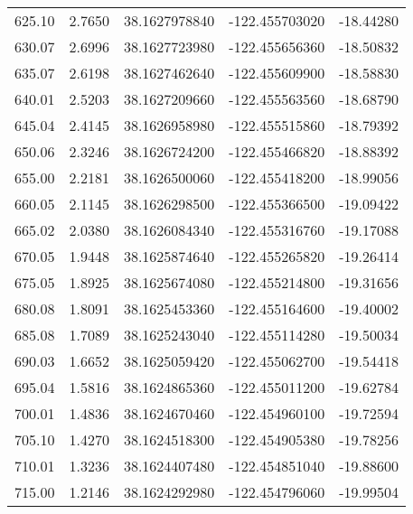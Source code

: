 \begin{scriptsize}
\begin{longtable}{p{2.5cm}p{2.5cm}p{3cm}p{3cm}p{2.5cm}}
           625.10  & 	 2.7650 &               38.1627978840  &   -122.455703020   &	-18.44280 \\
           630.07  & 	 2.6996 &               38.1627723980  &   -122.455656360   &	-18.50832 \\
           635.07  & 	 2.6198 &               38.1627462640  &   -122.455609900   &	-18.58830 \\
           640.01  & 	 2.5203 &               38.1627209660  &   -122.455563560   &	-18.68790 \\
           645.04  & 	 2.4145 &               38.1626958980  &   -122.455515860   &	-18.79392 \\
           650.06  & 	 2.3246 &               38.1626724200  &   -122.455466820   &	-18.88392 \\
           655.00  & 	 2.2181 &               38.1626500060  &   -122.455418200   &	-18.99056 \\
           660.05  & 	 2.1145 &               38.1626298500  &   -122.455366500   &	-19.09422 \\
           665.02  & 	 2.0380 &               38.1626084340  &   -122.455316760   &	-19.17088 \\
           670.05  & 	 1.9448 &               38.1625874640  &   -122.455265820   &	-19.26414 \\
           675.05  & 	 1.8925 &               38.1625674080  &   -122.455214800   &	-19.31656 \\
           680.08  & 	 1.8091 &               38.1625453360  &   -122.455164600   &	-19.40002 \\
           685.08  & 	 1.7089 &               38.1625243040  &   -122.455114280   &	-19.50034 \\
           690.03  & 	 1.6652 &               38.1625059420  &   -122.455062700   &	-19.54418 \\
           695.04  & 	 1.5816 &               38.1624865360  &   -122.455011200   &	-19.62784 \\
           700.01  & 	 1.4836 &               38.1624670460  &   -122.454960100   &	-19.72594 \\
           705.10  & 	 1.4270 &               38.1624518300  &   -122.454905380   &	-19.78256 \\
           710.01  & 	 1.3236 &               38.1624407480  &   -122.454851040   &	-19.88600 \\
           715.00  & 	 1.2146 &               38.1624292980  &   -122.454796060   &	-19.99504 \\

\end{longtable}
\end{scriptsize}
